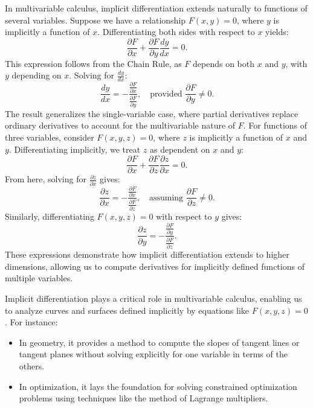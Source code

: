 \noindent In multivariable calculus, implicit differentiation extends naturally to functions of several variables. Suppose we have a relationship \( F(x, y) = 0 \), where \( y \) is implicitly a function of \( x \). Differentiating both sides with respect to \( x \) yields:
\[
\frac{\partial F}{\partial x} + \frac{\partial F}{\partial y} \frac{dy}{dx} = 0.
\]
This expression follows from the Chain Rule, as \( F \) depends on both \( x \) and \( y \), with \( y \) depending on \( x \). Solving for \( \frac{dy}{dx} \):
\[
\frac{dy}{dx} = -\frac{\frac{\partial F}{\partial x}}{\frac{\partial F}{\partial y}}, \quad \text{provided } \frac{\partial F}{\partial y} \neq 0.
\]
The result generalizes the single-variable case, where partial derivatives replace ordinary derivatives to account for the multivariable nature of \( F \). For functions of three variables, consider \( F(x, y, z) = 0 \), where \( z \) is implicitly a function of \( x \) and \( y \). Differentiating implicitly, we treat \( z \) as dependent on \( x \) and \( y \):
\[
\frac{\partial F}{\partial x} + \frac{\partial F}{\partial z} \frac{\partial z}{\partial x} = 0.
\]
From here, solving for \( \frac{\partial z}{\partial x} \) gives:
\[
\frac{\partial z}{\partial x} = -\frac{\frac{\partial F}{\partial x}}{\frac{\partial F}{\partial z}}, \quad \text{assuming } \frac{\partial F}{\partial z} \neq 0.
\]
Similarly, differentiating \( F(x, y, z) = 0 \) with respect to \( y \) gives:
\[
\frac{\partial z}{\partial y} = -\frac{\frac{\partial F}{\partial y}}{\frac{\partial F}{\partial z}}.
\]
These expressions demonstrate how implicit differentiation extends to higher dimensions, allowing us to compute derivatives for implicitly defined functions of multiple variables.

\noindent Implicit differentiation plays a critical role in multivariable calculus, enabling us to analyze curves and surfaces defined implicitly by equations like \( F(x, y, z) = 0 \). For instance:
\begin{itemize}
    \item In geometry, it provides a method to compute the slopes of tangent lines or tangent planes without solving explicitly for one variable in terms of the others.
    \item In optimization, it lays the foundation for solving constrained optimization problems using techniques like the method of Lagrange multipliers.
\end{itemize}

